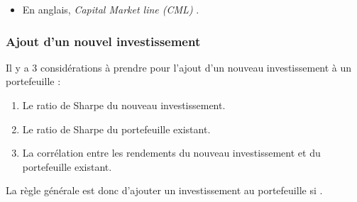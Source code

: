 \documentclass[10pt, french]{article}
\begin{document}
\begin{multicols*}{2}
\begin{definitionNOHFILL}
\begin{center}

\end{center}
\begin{itemize}
	\item	En anglais, \og \textit{Capital Market line (CML)} \fg{}.
\end{itemize}
\end{definitionNOHFILL}


\columnbreak
\subsubsection{Ajout d'un nouvel investissement}
\label{sec:MVT-newinv}
Il y a 3 considérations à prendre pour l'ajout d'un nouveau investissement à un portefeuille :
\begin{enumerate}
	\item	Le ratio de Sharpe du nouveau investissement.
	\item	Le ratio de Sharpe du portefeuille existant.
	\item	La corrélation entre les rendements du nouveau investissement et du portefeuille existant.
\end{enumerate}

La règle générale est donc d'ajouter un investissement au portefeuille si .




\end{multicols*}
\end{document}

